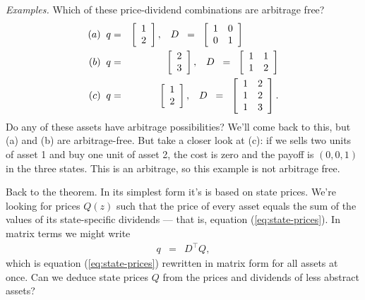 \documentclass[11pt]{article}
\begin{document}
{\it Examples.\/}
Which of these price-dividend combinations are arbitrage free?
\begin{eqnarray*}
  (a) \;\;  q &=& \left[
            \begin{array}{c}
             1 \\ 2
            \end{array}
          \right], \;\;\;
        D \;\;=\;\;
            \left[
            \begin{array}{cc}
             1 & 0 \\ 0 & 1
            \end{array}
          \right]    \hspace*{0.5in}  \\
  (b) \;\;  q &=& \left[
            \begin{array}{c}
             2 \\ 3
            \end{array}
          \right], \;\;\;
        D \;\;=\;\;
            \left[
            \begin{array}{cc}
             1 & 1 \\ 1 & 2
            \end{array}
          \right]      \\
  (c) \;\;  q &=& \left[
            \begin{array}{c}
             1 \\ 2
            \end{array}
          \right], \;\;\;
        D \;\;=\;\;
            \left[
            \begin{array}{cc}
             1 & 2 \\ 1 & 2 \\ 1 & 3
            \end{array}
          \right]        .
\end{eqnarray*}
Do any of these assets have arbitrage possibilities?
We'll come back to this, but (a) and (b) are arbitrage-free.
But take a closer look at (c):
if we sells two units of asset 1 and buy one unit of asset 2,
the cost is zero and the payoff is $(0, 0, 1)$ in the three states.
This is an arbitrage, so this example is not arbitrage free.

Back to the theorem.
In its simplest form it's is based on state prices.
We're looking for prices $Q(z)$ %
such that the price of every asset equals the sum of the values
of its state-specific dividends ---
that is, equation (\ref{eq:state-prices}).
In matrix terms we might write
\begin{eqnarray}
    q &=&  D^\top Q,
    \label{eq:state-prices-matrix}
\end{eqnarray}
which is equation (\ref{eq:state-prices}) rewritten in matrix form
for all assets at once.
Can we deduce state prices $Q$ from the prices and dividends of
less abstract assets?
\end{document}
